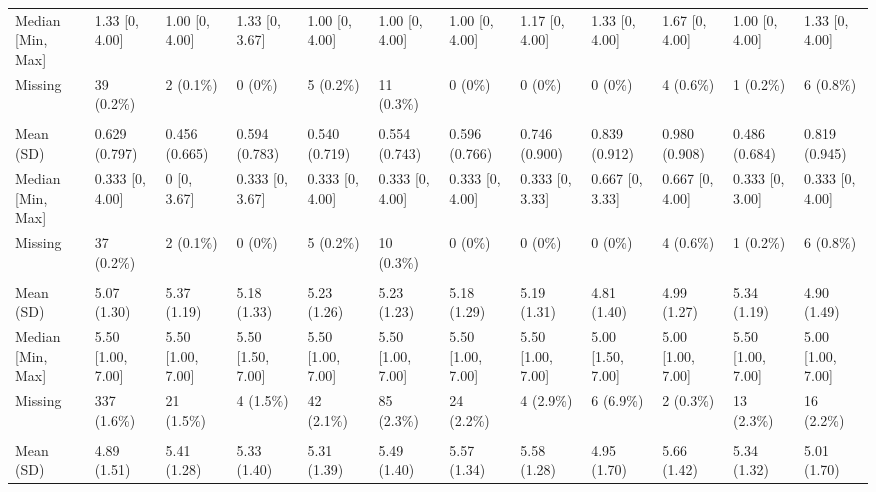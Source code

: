 \documentclass[
  single column]{article}
\begin{document}
\begin{landscape}
\begin{tabular}[t]{llllllllllll}
\hspace{1em}Median [Min, Max] & 1.33 [0, 4.00] & 1.00 [0, 4.00] & 1.33 [0, 3.67] & 1.00 [0, 4.00] & 1.00 [0, 4.00] & 1.00 [0, 4.00] & 1.17 [0, 4.00] & 1.33 [0, 4.00] & 1.67 [0, 4.00] & 1.00 [0, 4.00] & 1.33 [0, 4.00]\\
\hspace{1em}Missing & 39 (0.2\%) & 2 (0.1\%) & 0 (0\%) & 5 (0.2\%) & 11 (0.3\%) & 0 (0\%) & 0 (0\%) & 0 (0\%) & 4 (0.6\%) & 1 (0.2\%) & 6 (0.8\%)\\
\addlinespace[0.3em]
\multicolumn{12}{l}{\textbf{kessler\_latent\_depression}}\\
\hspace{1em}Mean (SD) & 0.629 (0.797) & 0.456 (0.665) & 0.594 (0.783) & 0.540 (0.719) & 0.554 (0.743) & 0.596 (0.766) & 0.746 (0.900) & 0.839 (0.912) & 0.980 (0.908) & 0.486 (0.684) & 0.819 (0.945)\\
\hspace{1em}Median [Min, Max] & 0.333 [0, 4.00] & 0 [0, 3.67] & 0.333 [0, 3.67] & 0.333 [0, 4.00] & 0.333 [0, 4.00] & 0.333 [0, 4.00] & 0.333 [0, 3.33] & 0.667 [0, 3.33] & 0.667 [0, 4.00] & 0.333 [0, 3.00] & 0.333 [0, 4.00]\\
\hspace{1em}Missing & 37 (0.2\%) & 2 (0.1\%) & 0 (0\%) & 5 (0.2\%) & 10 (0.3\%) & 0 (0\%) & 0 (0\%) & 0 (0\%) & 4 (0.6\%) & 1 (0.2\%) & 6 (0.8\%)\\
\addlinespace[0.3em]
\multicolumn{12}{l}{\textbf{lifesat}}\\
\hspace{1em}Mean (SD) & 5.07 (1.30) & 5.37 (1.19) & 5.18 (1.33) & 5.23 (1.26) & 5.23 (1.23) & 5.18 (1.29) & 5.19 (1.31) & 4.81 (1.40) & 4.99 (1.27) & 5.34 (1.19) & 4.90 (1.49)\\
\hspace{1em}Median [Min, Max] & 5.50 [1.00, 7.00] & 5.50 [1.00, 7.00] & 5.50 [1.50, 7.00] & 5.50 [1.00, 7.00] & 5.50 [1.00, 7.00] & 5.50 [1.00, 7.00] & 5.50 [1.00, 7.00] & 5.00 [1.50, 7.00] & 5.00 [1.00, 7.00] & 5.50 [1.00, 7.00] & 5.00 [1.00, 7.00]\\
\hspace{1em}Missing & 337 (1.6\%) & 21 (1.5\%) & 4 (1.5\%) & 42 (2.1\%) & 85 (2.3\%) & 24 (2.2\%) & 4 (2.9\%) & 6 (6.9\%) & 2 (0.3\%) & 13 (2.3\%) & 16 (2.2\%)\\
\addlinespace[0.3em]
\multicolumn{12}{l}{\textbf{meaning\_purpose}}\\
\hspace{1em}Mean (SD) & 4.89 (1.51) & 5.41 (1.28) & 5.33 (1.40) & 5.31 (1.39) & 5.49 (1.40) & 5.57 (1.34) & 5.58 (1.28) & 4.95 (1.70) & 5.66 (1.42) & 5.34 (1.32) & 5.01 (1.70)\\

\end{tabular}
\end{landscape}
\end{document}
